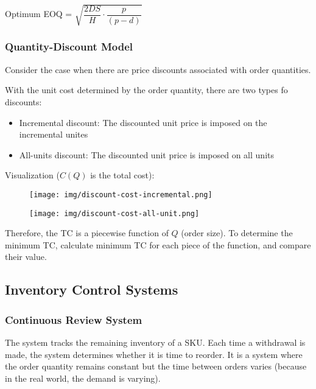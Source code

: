 \documentclass{article}
\begin{document}
Optimum EOQ = $\sqrt{
		\dfrac{2DS}{H} \cdot \dfrac{p}{(p-d)}
	}$

\subsubsection{Quantity-Discount Model}

Consider the case when there are price discounts associated with order quantities.

With the unit cost determined by the order quantity, there are two types fo discounts:
\begin{itemize}
	\item Incremental discount: The discounted unit price is imposed on the incremental unites
	\item All-units discount: The discounted unit price is imposed on all units
\end{itemize}

Visualization ($C(Q)$ is the total cost):

\begin{figure}[H]
	\centering
	\begin{minipage}[t]{0.49\textwidth}
		\centering
		\texttt{[image: img/discount-cost-incremental.png]}
	\end{minipage}
	\begin{minipage}[t]{0.49\textwidth}
		\centering
		\texttt{[image: img/discount-cost-all-unit.png]}
	\end{minipage}
\end{figure}

Therefore, the TC is a piecewise function of $Q$ (order size).
To determine the minimum TC, calculate minimum TC for each piece of the function, and compare their value.

\subsection{Inventory Control Systems}

\subsubsection{Continuous Review System}

The system tracks the remaining inventory of a SKU.
Each time a withdrawal is made, the system determines whether it is time to reorder.
It is a system where the order quantity remains constant but the time between orders varies
(because in the real world, the demand is varying).
\end{document}
